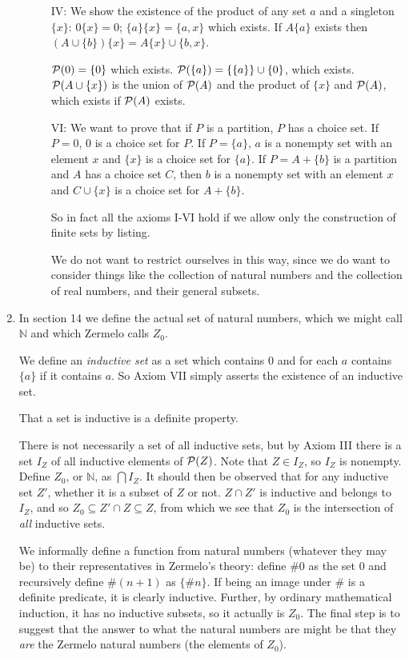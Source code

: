 \documentclass[12pt]{article}
\begin{document}
\begin{enumerate}
\begin{description}
IV:  We show the existence of the product of any set $a$ and a singleton $\{x\}$:  $0\{x\} = 0$;  $\{a\}\{x\} = \{a,x\}$ which exists.  If $A\{a\}$ exists then
$(A \cup \{b\})\{x\} = A\{x\} \cup \{b,x\}$.

${\cal P}(0) = \{0\}$ which exists.  ${\cal P}(\{a\}) = \{\{a\}\} \cup \{0\}$, which exists.  ${\cal P}(A \cup \{x\})$  is the union of ${\cal P}(A)$ and the product of
$\{x\}$ and ${\cal P}(A)$, which exists if ${\cal P}(A)$ exists.

VI:  We want to prove that if $P$ is a partition, $P$ has a choice set.  If $P=0$, 0 is a choice set for $P$.  If $P= \{a\}$, $a$ is a nonempty set with an element $x$
and $\{x\}$ is a choice set for $\{a\}$.  If $P = A + \{b\}$ is a partition and $A$ has a choice set $C$, then $b$ is a nonempty set with an element $x$ and $C \cup \{x\}$ is a choice set for $A+\{b\}$.


So in fact all the axioms I-VI hold if we allow only the construction of finite sets by listing.

We do not want to restrict ourselves in this way, since we do want to consider things like the collection of natural numbers and the collection of real numbers, and their general subsets.

\end{description}

\item In section 14 we define the actual set of natural numbers, which we might call $\mathbb N$ and which Zermelo calls $Z_0$.

We define an {\em inductive set\/} as a set which contains 0 and for each $a$ contains $\{a\}$ if it contains $a$.  So Axiom VII simply asserts the existence of
an inductive set.

That a set is inductive is a definite property.

There is not necessarily a set of all inductive sets, but by Axiom III there is a set $I_Z$ of all inductive elements of ${\cal P}(Z)$.  Note that $Z \in I_Z$, so $I_Z$ is
nonempty.  Define $Z_0$, or $\mathbb N$, as $\bigcap I_Z$.  It should then be observed that for any inductive set $Z'$, whether it is a subset of $Z$ or not.
$Z \cap Z'$ is inductive and belongs to $I_Z$, and so $Z_0 \subseteq Z'\cap Z \subseteq Z$, from which we see that $Z_0$ is the intersection of {\em all\/} inductive sets.

We informally define a function from natural numbers (whatever they may be)  to their representatives in Zermelo's theory:  define $\# 0$ as the set $0$ and recursively define
$\# (n+1)$ as $\{\# n\}$.   If being an image under $\#$ is a definite predicate, it is clearly inductive.  Further, by ordinary mathematical induction, it has no inductive subsets, so it actually is $Z_0$.  The final step is to suggest that the answer to what the natural numbers are might be that they {\em are\/} the Zermelo natural numbers (the elements of $Z_0$).

\end{enumerate}
\end{document}
